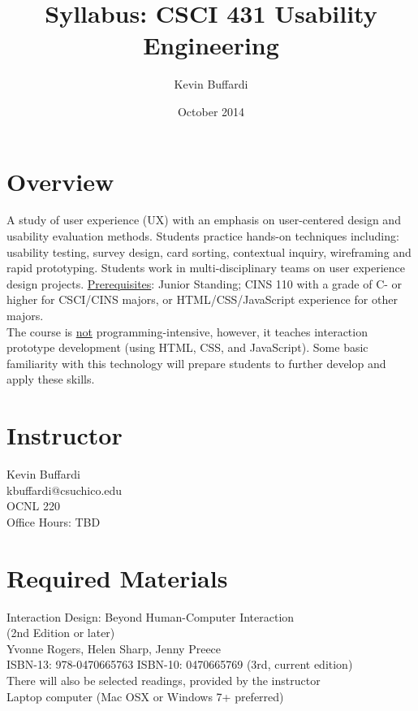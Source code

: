 \documentclass[12pt]{article}
\title{Syllabus: CSCI 431 Usability Engineering}
\author{Kevin Buffardi}
\date{October 2014}
\begin{document}
  \maketitle
  \section*{Overview}	 
  \noindent
  A study of user experience (UX) with an emphasis on user-centered design and usability evaluation methods. Students practice hands-on techniques including: usability testing, survey design, card sorting, contextual inquiry, wireframing and rapid prototyping. Students work in multi-disciplinary teams on user experience design projects.
  \newline
  \newline
  \underline{Prerequisites}: Junior Standing; CINS 110 with a grade of C- or higher for CSCI/CINS majors, or HTML/CSS/JavaScript experience for other majors. \\
  \newline
  The course is \underline{not} programming-intensive, however, it teaches interaction prototype development (using HTML, CSS, and JavaScript). Some basic familiarity with this technology will prepare students to further develop and apply these skills. 
  
  \section*{Instructor}
  \noindent
  Kevin Buffardi \\
  kbuffardi@csuchico.edu \\
  OCNL 220 \\
  Office Hours: TBD\\

  \section*{Required Materials}
  \noindent
  Interaction Design: Beyond Human-Computer Interaction \\
  (2nd Edition or later) \\
  Yvonne Rogers, Helen Sharp, Jenny Preece \\
  ISBN-13: 978-0470665763  ISBN-10: 0470665769 (3rd, current edition) \\
  \newline
  There will also be selected readings, provided by the instructor \\
  \newline
  Laptop computer (Mac OSX or Windows 7+ preferred)
\end{document}
